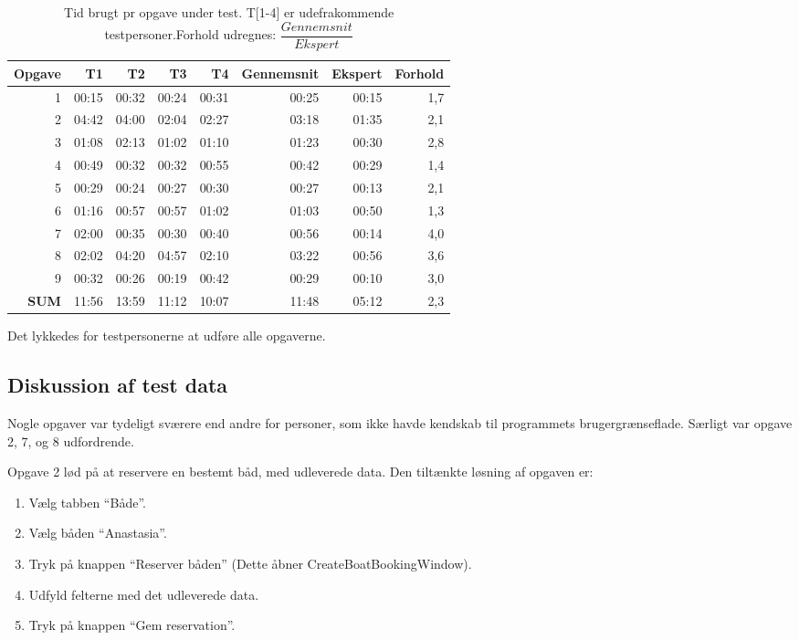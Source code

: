 \begin{table}[htbp]
  \centering
    \begin{tabular}{r|rrrr|r|r|r}
    \textbf{Opgave} & T1     & T2     & T3     & T4     & \textbf{Gennemsnit} & \textbf{Ekspert} & \textbf{Forhold} \\ \hline
    1     & 00:15 & 00:32 & 00:24 & 00:31 & 00:25 & 00:15 & 1,7 \\
    2     & 04:42 & 04:00 & 02:04 & 02:27 & 03:18 & 01:35 & 2,1 \\
    3     & 01:08 & 02:13 & 01:02 & 01:10 & 01:23 & 00:30 & 2,8 \\
    4     & 00:49 & 00:32 & 00:32 & 00:55 & 00:42 & 00:29 & 1,4 \\
    5     & 00:29 & 00:24 & 00:27 & 00:30 & 00:27 & 00:13 & 2,1 \\
    6     & 01:16 & 00:57 & 00:57 & 01:02 & 01:03 & 00:50 & 1,3 \\
    7     & 02:00 & 00:35 & 00:30 & 00:40 & 00:56 & 00:14 & 4,0 \\
    8     & 02:02 & 04:20 & 04:57 & 02:10 & 03:22 & 00:56 & 3,6 \\
    9     & 00:32 & 00:26 & 00:19 & 00:42 & 00:29 & 00:10 & 3,0 \\ \hline
    \textbf{SUM} & 11:56 & 13:59 & 11:12 & 10:07 & 11:48 & 05:12 & 2,3 \\
    \end{tabular}%
    \caption{Tid brugt pr opgave under test. T[1-4] er udefrakommende testpersoner.\newline Forhold udregnes: $ \dfrac{Gennemsnit}{Ekspert} $}
  \label{tab:TestTimeTable}%
\end{table}%

Det lykkedes for testpersonerne at udføre alle opgaverne.

\subsection{Diskussion af test data}

Nogle opgaver var tydeligt sværere end andre for personer, som ikke havde kendskab til programmets brugergrænseflade. 
Særligt var opgave 2, 7, og 8 udfordrende.


Opgave 2 lød på at reservere en bestemt båd, med udleverede data.
Den tiltænkte løsning af opgaven er:
\begin{enumerate}
    \item Vælg tabben ``Både''.
    \item Vælg båden ``Anastasia''.
    \item Tryk på knappen ``Reserver båden'' (Dette åbner CreateBoatBookingWindow).
    \item Udfyld felterne med det udleverede data.
    \item Tryk på knappen ``Gem reservation''.
\end{enumerate}

